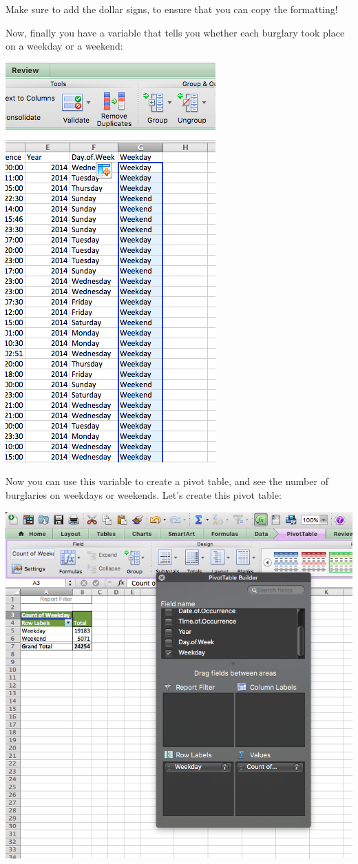 \documentclass[]{book}
\theoremstyle{definition}
\theoremstyle{definition}
\theoremstyle{definition}
\theoremstyle{remark}
\begin{document}
Make sure to add the dollar signs, to ensure that you can copy the
formatting!

Now, finally you have a variable that tells you whether each burglary
took place on a weekday or a weekend:

\includegraphics{imgs/wkday_var_created.png}

Now you can use this variable to create a pivot table, and see the
number of burglaries on weekdays or weekends. Let's create this pivot
table:

\includegraphics{imgs/wkday_pivot.png}
\end{document}
